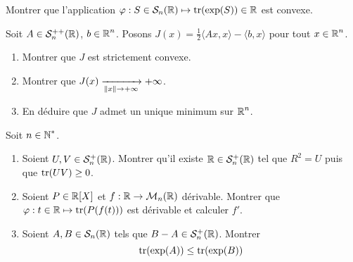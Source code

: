 \begin{exo}[Convexité 1]
	\label{euclidiens4}
	Montrer que l'application $\varphi : S\in\mathcal S_n(\operatorname{\mathbb R})\mapsto \operatorname{tr}(\exp(S))\in\operatorname{\mathbb R}$ est convexe.
\end{exo}

\begin{exo}[Convexité 2]
	\label{euclidiens5}
	Soit $A\in\mathcal S_n^{++}(\operatorname{\mathbb R})$, $b\in\operatorname{\mathbb R}^n$.
	Posons $J(x)=\frac12\langle Ax,x\rangle - \langle b,x\rangle$ pour tout $x\in\operatorname{\mathbb R}^n$.
	\begin{enumerate}
		\item Montrer que $J$ est strictement convexe.
		\item Montrer que $J(x)\xrightarrow[\left\lVert x\right\rVert\to+\infty]{}+\infty$.
		\item En déduire que $J$ admet un unique minimum sur $\operatorname{\mathbb R}^n$.
	\end{enumerate}
\end{exo}

\begin{exo}
	\label{euclidiens6}
	Soit $n\in\operatorname{\mathbb N}^*$.
	\begin{enumerate}
		\item Soient $U,V\in\mathcal S_n^+(\operatorname{\mathbb R})$. Montrer qu'il existe $\operatorname{\mathbb R}\in\mathcal S_n^+(\operatorname{\mathbb R})$ tel que $R^2 = U$ puis que $\operatorname{tr}(UV)\geq 0$.
		\item Soient $P\in\operatorname{\mathbb R}[X]$ et $f:\operatorname{\mathbb R}\to\mathcal M_n(\operatorname{\mathbb R})$ dérivable. Montrer que $\varphi:t\in\operatorname{\mathbb R}\mapsto\operatorname{tr}(P(f(t)))$ est dérivable et calculer $f'$.
		\item Soient $A,B\in\mathcal S_n(\operatorname{\mathbb R})$ tels que $B-A\in\mathcal S_n^+(\operatorname{\mathbb R})$. Montrer 
		\[
			\operatorname{tr}(\exp(A))\leq\operatorname{tr}(\exp(B))
		\]
	\end{enumerate}
\end{exo}